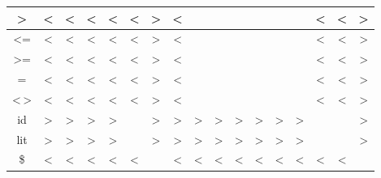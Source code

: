 \documentclass[11pt,a4paper]{article}
\begin{document}
\begin{center}
\begin{LARGE}
\begin{tabular}{|c||c|c|c|c|c|c|c|c|c|c|c|c|c|c|c|c|}
	\hline
	\cellcolor{green}>&\color{blue}<&\color{blue}<&\color{blue}<&\color{blue}<&\color{blue}<&\color{red}>&\color{blue}<&&&&&&&\color{blue}<&\color{blue}<&\color{red}>\\
	\hline
	\cellcolor{green}<=&\color{blue}<&\color{blue}<&\color{blue}<&\color{blue}<&\color{blue}<&\color{red}>&\color{blue}<&&&&&&&\color{blue}<&\color{blue}<&\color{red}>\\
	\hline
	\cellcolor{green}>=&\color{blue}<&\color{blue}<&\color{blue}<&\color{blue}<&\color{blue}<&\color{red}>&\color{blue}<&&&&&&&\color{blue}<&\color{blue}<&\color{red}>\\
	\hline
	\cellcolor{green}=&\color{blue}<&\color{blue}<&\color{blue}<&\color{blue}<&\color{blue}<&\color{red}>&\color{blue}<&&&&&&&\color{blue}<&\color{blue}<&\color{red}>\\
	\hline
	\cellcolor{green}<\,>&\color{blue}<&\color{blue}<&\color{blue}<&\color{blue}<&\color{blue}<&\color{red}>&\color{blue}<&&&&&&&\color{blue}<&\color{blue}<&\color{red}>\\
	\hline
	\cellcolor{green}id&\color{red}>&\color{red}>&\color{red}>&\color{red}>&&\color{red}>&\color{red}>&\color{red}>&\color{red}>&\color{red}>&\color{red}>&\color{red}>&\color{red}>&&&\color{red}>\\
	\hline
	\cellcolor{green}lit&\color{red}>&\color{red}>&\color{red}>&\color{red}>&&\color{red}>&\color{red}>&\color{red}>&\color{red}>&\color{red}>&\color{red}>&\color{red}>&\color{red}>&&&\color{red}>\\
	\hline
	\cellcolor{green}\$&\color{blue}<&\color{blue}<&\color{blue}<&\color{blue}<&\color{blue}<&&\color{blue}<&\color{blue}<&\color{blue}<&\color{blue}<&\color{blue}<&\color{blue}<&\color{blue}<&\color{blue}<&\color{blue}<&\\
	\hline
	
	\end{tabular}
	\end{LARGE}
	\end{center}
\end{document}
